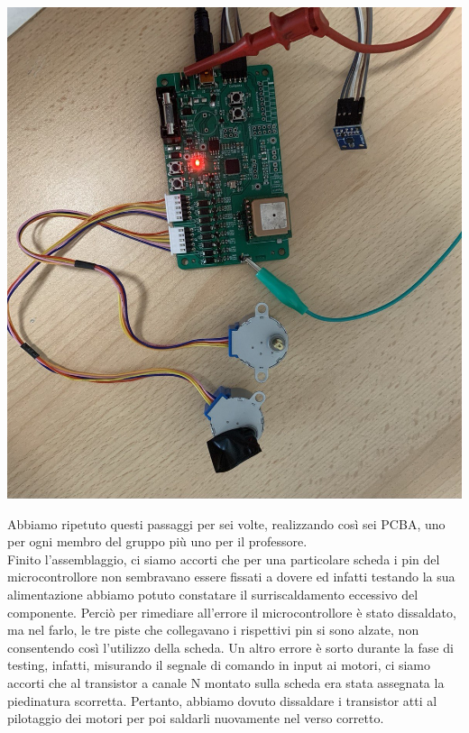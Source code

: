 \begin{center}
\includegraphics[scale=0.4]{figures/image101.png}
\captionsetup{type=figure}
\end{center}

Abbiamo ripetuto questi passaggi per sei volte, realizzando così sei PCBA, uno per ogni membro del gruppo più uno per il professore.\\
Finito l’assemblaggio, ci siamo accorti che per una particolare scheda i pin del microcontrollore non sembravano 
essere fissati a dovere ed infatti testando la sua alimentazione abbiamo potuto constatare il surriscaldamento eccessivo 
del componente. Perciò per rimediare all’errore il microcontrollore è stato dissaldato, ma nel farlo, le tre piste che collegavano 
i rispettivi pin si sono alzate, non consentendo così l’utilizzo della scheda. Un altro errore è sorto durante la fase di testing, 
infatti, misurando il segnale di comando in input ai motori, ci siamo accorti che al transistor a canale N montato sulla scheda era 
stata assegnata la piedinatura scorretta. Pertanto, abbiamo dovuto dissaldare i transistor atti al pilotaggio dei motori per poi 
saldarli nuovamente nel verso corretto.

